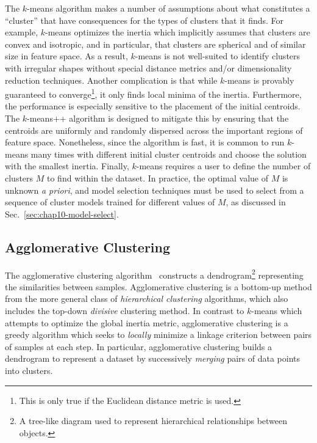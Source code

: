 The $k$-means algorithm makes a number of assumptions about what constitutes a ``cluster'' that have consequences for the types of clusters that it finds. For example, $k$-means optimizes the inertia which implicitly assumes that clusters are convex and isotropic, and in particular, that clusters are spherical and of similar size in feature space. As a result, $k$-means is not well-suited to identify clusters with irregular shapes without special distance metrics and/or dimensionality reduction techniques. Another complication is that while $k$-means is provably guaranteed to converge\footnote{This is only true if the Euclidean distance metric is used.}, it only finds local minima of the inertia. Furthermore, the performance is especially sensitive to the placement of the initial centroids. The $k$-means++ algorithm is designed to mitigate this by ensuring that the centroids are uniformly and randomly dispersed across the important regions of feature space. Nonetheless, since the algorithm is fast, it is common to run $k$-means many times with different initial cluster centroids and choose the solution with the smallest inertia. Finally, $k$-means requires a user to define the number of clusters $M$ to find within the dataset. In practice, the optimal value of $M$ is unknown \textit{a priori}, and model selection techniques must be used to select from a sequence of cluster models trained for different values of $M$, as discussed in Sec.~\ref{sec:chap10-model-select}.


\subsection{Agglomerative Clustering}
\label{subsec:chap10-agglomerative}

The agglomerative clustering algorithm~\cite{johnson1967hierarchical} constructs a dendrogram\footnote{A tree-like diagram used to represent hierarchical relationships between objects.} representing the similarities between samples. Agglomerative clustering is a bottom-up method from the more general class of \textit{hierarchical clustering} algorithms, which also includes the top-down \textit{divisive} clustering method. In contrast to $k$-means which attempts to optimize the global inertia metric, agglomerative clustering is a greedy algorithm which seeks to \textit{locally} minimize a linkage criterion between pairs of samples at each step. In particular, agglomerative clustering builds a dendrogram to represent a dataset  by successively \textit{merging} pairs of data points into clusters.

